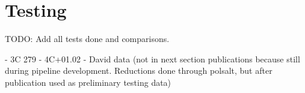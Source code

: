 \chapter{Testing}

TODO: Add all tests done and comparisons.

- 3C 279
- 4C+01.02
- David data (not in next section publications because still during pipeline development. Reductions done through polsalt, but after publication used as preliminary testing data)